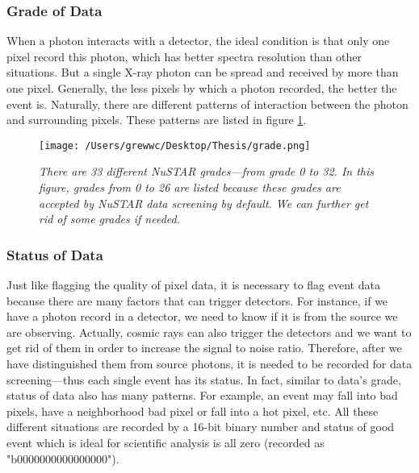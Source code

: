 \documentclass[12pt]{report}
\begin{document}
            \subsubsection{Grade of Data}  
            When a photon interacts with a detector, the ideal condition is that only one pixel record this photon,
            which has better spectra resolution than other situations. 
            But a single X-ray photon can be spread and received by more than one pixel. Generally, the less pixels
            by which a photon recorded, the better the event is. 
            Naturally, there are different patterns of interaction between the
            photon and surrounding pixels. These patterns are listed in figure \ref{fig:nustar_grade}.  
            \begin{figure}[h] 
              \centering
              \texttt{[image: /Users/grewwc/Desktop/Thesis/grade.png]}
              \begin{minipage}[c]{0.85\textwidth}
                \caption{\textit{\footnotesize There are 33 different \textit{NuSTAR} grades---from grade 0 to 32.
                          In this figure, grades from 0 to 26 are listed because these grades are accepted by 
                          \textit{NuSTAR} data screening by default. We can further get rid of some grades if needed.}
                          }
              \label{fig:nustar_grade}
              \end{minipage}
              
            \end{figure}


            \subsubsection{Status of Data} 
            Just like flagging the quality of pixel data, it is necessary to flag event data because there are many
            factors that can trigger detectors. For instance, if we have a photon record in a detector, we need to 
            know if it is from the source we are observing. Actually, cosmic rays can also trigger the 
            detectors and we want to get rid of them in order to increase the signal to noise ratio. 
            Therefore, after we have distinguished them from source photons, it is needed to be recorded for data
            screening---thus each single event has its status. In fact, similar to data's grade, status of data also
            has many patterns. For example, an event may fall into bad pixels, have a neighborhood bad pixel
            or fall into a hot pixel, etc. All these different situations are recorded by a 16-bit binary number and
            status of good event which is ideal for scientific analysis is all zero (recorded as "b0000000000000000").
\end{document}
